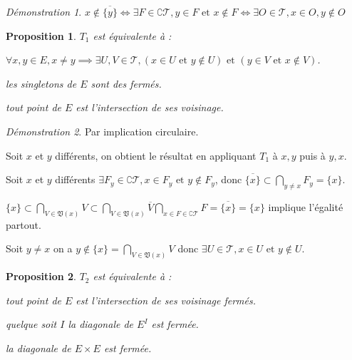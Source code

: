 \documentclass[a4paper, 11pt, french]{book}
\newenvironment{itemise}{\itemize}{\enditemize}
\theoremstyle{plain} %
\newtheorem{proposition}{Proposition}
\theoremstyle{definition} %
\theoremstyle{remark} %
\newtheorem*{demonstration}{Démonstration}
\newcommand{\1}{\mathds{1}}
\newcommand\et{\text{ et }}
\renewcommand{\frak}[1]{\mathfrak{#1}}
\newcommand{\scr}[1]{\mathscr{#1}}
\begin{document}
\begin{demonstration}
	$x\notin\overline{\{y\}}
		\iff\exists F\in\complement\scr{T}, y\in F\et x\notin F
		\iff\exists O\in\scr{T}, x\in O, y\notin O$
\end{demonstration}

\begin{proposition}
	$T_1$ est équivalente à :
	\begin{itemise}
		\item $\forall x, y\in E, x\neq y\implies\exists U, V\in\scr{T}, (x\in U\et y\notin U)\et(y\in V\et x\notin V)$.
		\item les singletons de $E$ sont des fermés.
		\item tout point de $E$ est l'intersection de ses voisinage.
	\end{itemise}
\end{proposition}

\begin{demonstration}
	Par implication circulaire.
	\begin{itemise}
		\item Soit $x$ et $y$ différents, on obtient le résultat en appliquant $T_1$ à $x, y$ puis à $y, x$.
		\item Soit $x$ et $y$ différents $\exists F_y\in\complement\scr{T}, x\in F_y\et y\notin F_y$, donc $\overline{\{x\}}\subset\bigcap_{y\neq x}F_y=\{x\}$.
		\item $\{x\}\subset\bigcap_{V\in\frak{V}(x)}V\subset\bigcap_{V\in\frak{V}(x)}\overline{V}\bigcap_{x\in F\in\complement\scr{T}}F=\overline{\{x\}}=\{x\}$ implique l'égalité partout.
		\item Soit $y\neq x$ on a $y\notin\{x\}=\bigcap_{V\in\frak{V}(x)}V$ donc $\exists U\in\scr{T}, x\in U\et y\notin U$.
	\end{itemise}
\end{demonstration}

\begin{proposition}
	$T_2$ est équivalente à :
	\begin{itemise}
		\item tout point de $E$ est l'intersection de ses voisinage fermés.
		\item quelque soit $I$ la diagonale de $E^I$ est fermée.
		\item la diagonale de $E\times E$ est fermée.
	\end{itemise}
\end{proposition}
\end{document}
